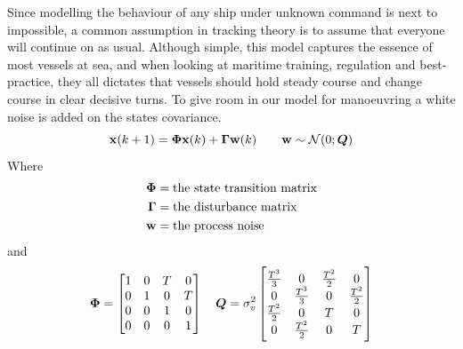 Since modelling the behaviour of any ship under unknown command is next to impossible, a common assumption in tracking theory is to assume that everyone will continue on as usual. Although simple, this model captures the essence of most vessels at sea, and when looking at maritime training, regulation and best-practice, they all dictates that vessels should hold steady course and change course in clear decisive turns. To give room in our model for manoeuvring a white noise is added on the states covariance. 
\begin{equation}
\boldsymbol{\mathbf{x}}(k+1) = \bm{\Phi} \boldsymbol{\mathbf{x}}(k) + \bm{\Gamma} \boldsymbol{\mathbf{w}}(k) \qquad \boldsymbol{\mathbf{w}} \sim \mathcal{N}(0;\bm{Q})
\label{eq:motion_model}
\end{equation}
Where 
\begin{equation}
\begin{split}
\bm{\Phi} 	&= \text{the state transition matrix} \\
\bm{\Gamma}	&= \text{the disturbance matrix} \\
\boldsymbol{\mathbf{w}}		&= \text{the process noise}
\end{split}
\end{equation}
and 
\begin{equation*}
\bm{\Phi} =	\begin{bmatrix}
1 & 0 & T & 0 \\
0 & 1 & 0 & T \\
0 & 0 & 1 & 0 \\
0 & 0 & 0 & 1 \\
\end{bmatrix}
\quad
\bm{Q}	= \sigma_v^2 \begin{bmatrix}
\frac{T^3}{3} 	& 0 				& \frac{T^2}{2}	& 0 			\\
0 				& \frac{T^3}{3}  	& 0 			& \frac{T^2}{2}	\\
\frac{T^2}{2}	& 0					& T				& 0				\\
0				& \frac{T^2}{2}		& 0				& T				\\
\end{bmatrix}
\end{equation*}



